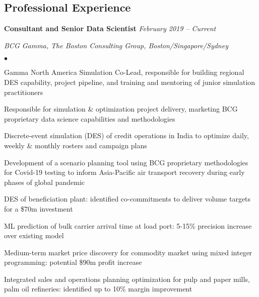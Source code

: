 \documentclass[margin,line]{resume}
\newenvironment{list1}{
  \begin{list}{}{%
      \setlength{\itemsep}{0in}
      \setlength{\parsep}{0in} \setlength{\parskip}{0in}
      \setlength{\topsep}{0in} \setlength{\partopsep}{0in}
      \setlength{\leftmargin}{0.17in}}}{\end{list}}
\newenvironment{list2}{
  \begin{list}{$\bullet$}{%
      \setlength{\itemsep}{0in}
      \setlength{\parsep}{0in} \setlength{\parskip}{0in}
      \setlength{\topsep}{0in} \setlength{\partopsep}{0in}
      \setlength{\leftmargin}{0.2in}}}{\end{list}}
\begin{document}
\begin{resume}
\section{\sc Professional Experience}
{\textbf{Consultant and Senior Data Scientist}} \hfill {\it February 2019 -- Current}\\
\vspace{-0.85\baselineskip}
\begin{list1}
\item {\it BCG Gamma, The Boston Consulting Group, Boston/Singapore/Sydney}
\begin{list2}
\item Gamma North America Simulation Co-Lead, responsible for building regional DES capability, project pipeline, and training and mentoring of junior simulation practitioners
\item Responsible for simulation \& optimization project delivery, marketing BCG proprietary data science capabilities and methodologies
\item Discrete-event simulation (DES) of credit operations in India to optimize daily, weekly \& monthly rosters and campaign plans
\item Development of a scenario planning tool using BCG proprietary methodologies for Covid-19 testing to inform Asia-Pacific air transport recovery during early phases of global pandemic
\item DES of beneficiation plant: identified co-commitments to deliver volume targets for a \$70m investment 
\item ML prediction of bulk carrier arrival time at load port: 5-15\% precision increase over existing model
\item Medium-term market price discovery for commodity market using mixed integer programming: potential \$90m profit increase
\item Integrated sales and operations planning optimization for pulp and paper mills, palm oil refineries: identified up to 10\% margin improvement 
\end{list2}
\end{list1}


\end{resume}
\end{document}
